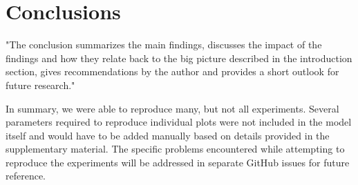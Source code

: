 \section*{Conclusions}

"The conclusion summarizes the main findings, discusses the impact of the findings and
how they relate back to the big picture described in the introduction section, gives
recommendations by the author and provides a short outlook for future research."

In summary, we were able to reproduce many, but not all experiments. Several parameters required to reproduce individual plots were not included in the model itself and would have to be added manually based on details provided in the supplementary material. The specific problems encountered while attempting to reproduce the experiments will be addressed in separate GitHub issues for future reference. 
\\
\\